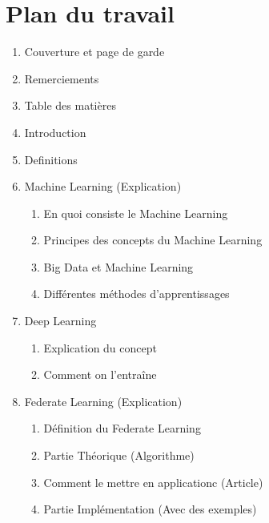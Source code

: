 \documentclass[12pt,a4paper]{article}
\begin{document}
\part*{Plan du travail}

\begin{enumerate}
	\item Couverture et page de garde
	\item Remerciements
	\item Table des matières
	\item Introduction
	\item Definitions
	\item Machine Learning (Explication)
		\begin{enumerate}
			\item En quoi consiste le Machine Learning
			\item Principes des concepts du Machine Learning
			\item Big Data et Machine Learning
			\item Différentes méthodes d'apprentissages
		\end{enumerate}
	\item Deep Learning
		\begin{enumerate}
			\item Explication du concept
			\item Comment on l'entraîne
		\end{enumerate}
	\item Federate Learning (Explication)
		\begin{enumerate}
			\item Définition du Federate Learning
			\item Partie Théorique (Algorithme)
			\item Comment le mettre en applicationc (Article)
			\item Partie Implémentation (Avec des exemples)
		\end{enumerate}
\end{enumerate}
	






 
\end{document}
